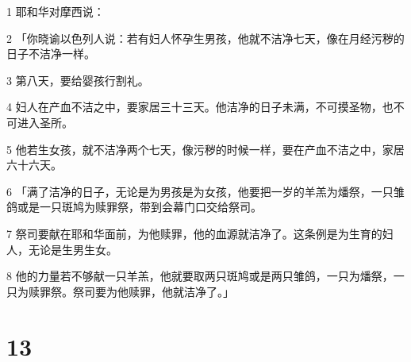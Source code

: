 \par 1 耶和华对摩西说：
\par 2 「你晓谕以色列人说：若有妇人怀孕生男孩，他就不洁净七天，像在月经污秽的日子不洁净一样。
\par 3 第八天，要给婴孩行割礼。
\par 4 妇人在产血不洁之中，要家居三十三天。他洁净的日子未满，不可摸圣物，也不可进入圣所。
\par 5 他若生女孩，就不洁净两个七天，像污秽的时候一样，要在产血不洁之中，家居六十六天。
\par 6 「满了洁净的日子，无论是为男孩是为女孩，他要把一岁的羊羔为燔祭，一只雏鸽或是一只斑鸠为赎罪祭，带到会幕门口交给祭司。
\par 7 祭司要献在耶和华面前，为他赎罪，他的血源就洁净了。这条例是为生育的妇人，无论是生男生女。
\par 8 他的力量若不够献一只羊羔，他就要取两只斑鸠或是两只雏鸽，一只为燔祭，一只为赎罪祭。祭司要为他赎罪，他就洁净了。」

\chapter{13}

